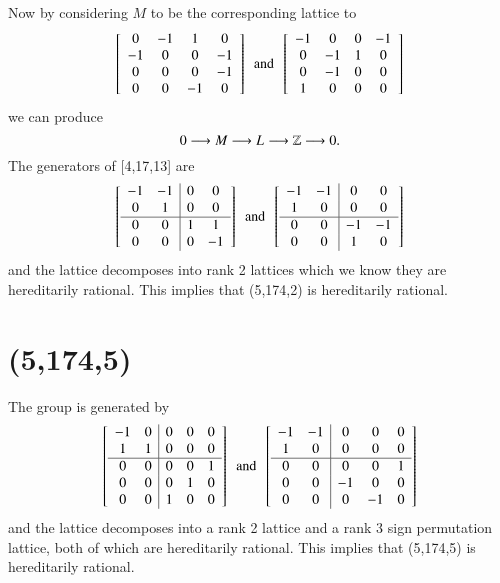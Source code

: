 Now by considering $M$ to be the corresponding lattice to 
$$
 \left[ \begin {array}{cccc} 0&-1&1&0\\-1&0&0&-1
\\0&0&0&-1\\0&0&-1&0\end {array}
 \right] 
 \,\,\, \text{and} \,\,\,
 \left[ \begin {array}{cccc} -1&0&0&-1\\0&-1&1&0
\\0&-1&0&0\\1&0&0&0\end {array}
 \right] 
$$
we can produce
$$
0 \longrightarrow M_{} \longrightarrow L_{} \longrightarrow \mathbb{Z} \longrightarrow 0
.$$
The generators of [4,17,13] are 
$$
 \left[ \begin {array}{cc|cc} -1&-1&0&0\\ 0&1&0&0
\\ \hline 0&0&1&1\\  0&0&0&-1\end {array}
 \right] 
 \,\,\, \text{and} \,\,\,
 \left[ \begin {array}{cc|cc} -1&-1&0&0\\ 1&0&0&0
\\ \hline 0&0&-1&-1\\ 0&0&1&0\end {array}
 \right] 
$$
and the lattice decomposes into rank 2 lattices which we know they are hereditarily rational. This implies that (5,174,2) is hereditarily rational.
  \section{(5,174,5)}
The group is generated by 
$$
 \left[ \begin {array}{cc|ccc} -1&0&0&0&0\\1&1&0&0&0
\\ \hline 0&0&0&0&1\\0&0&0&1&0
\\0&0&1&0&0\end {array} \right] 
\,\,\, \text{and} \,\,\,
 \left[ \begin {array}{cc|ccc} -1&-1&0&0&0\\1&0&0&0&0
\\ \hline 0&0&0&0&1\\0&0&-1&0&0
\\0&0&0&-1&0\end {array} \right] 
$$
and the lattice decomposes into a rank 2 lattice and a rank 3 sign permutation lattice, both of which are hereditarily rational. This implies that (5,174,5) is hereditarily rational.
